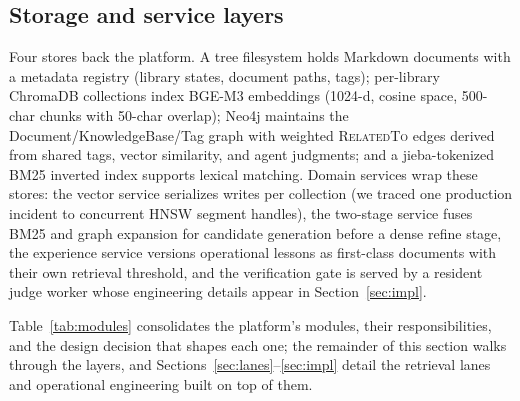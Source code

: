 \subsection{Storage and service layers}
Four stores back the platform. A tree filesystem holds Markdown documents
with a metadata registry (library states, document paths, tags); per-library
ChromaDB collections index BGE-M3 embeddings \cite{bge-m3,chroma} (1024-d,
cosine space, 500-char chunks with 50-char overlap); Neo4j \cite{neo4j}
maintains the Document/KnowledgeBase/Tag graph with weighted
\textsc{RelatedTo} edges derived from shared tags, vector similarity, and
agent judgments; and a jieba-tokenized BM25 inverted index \cite{bm25}
supports lexical matching. Domain services wrap these stores: the vector
service serializes writes per collection (we traced one production incident
to concurrent HNSW segment handles), the two-stage service fuses BM25 and
graph expansion for candidate generation before a dense refine stage, the
experience service versions operational lessons as first-class documents
with their own retrieval threshold, and the verification gate is served by
a resident judge worker whose engineering details appear in
Section~\ref{sec:impl}.

Table~\ref{tab:modules} consolidates the platform's modules, their
responsibilities, and the design decision that shapes each one; the
remainder of this section walks through the layers, and
Sections~\ref{sec:lanes}--\ref{sec:impl} detail the retrieval lanes and
operational engineering built on top of them.

